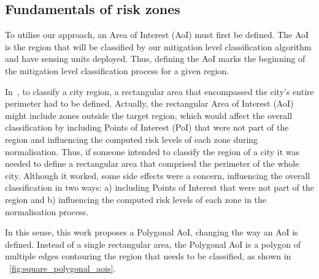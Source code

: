 \begin{refsection}
\section{Fundamentals of risk zones}\label{sec:proposed_approach}


To utilise our approach, an Area of Interest (AoI) must first be defined. The AoI is the region that will be classified by our mitigation level classification algorithm and have sensing units deployed. Thus, defining the AoI marks the beginning of the mitigation level classification process for a given region.

In~\cite{riskzones}, to classify a city region, a rectangular area that encompassed the city's entire perimeter had to be defined. Actually, the rectangular Area of Interest (AoI) might include zones outside the target region, which would affect the overall classification by including Points of Interest (PoI) that were not part of the region and influencing the computed risk levels of each zone during normalisation. Thus, if someone intended to classify the region of a city it was needed to define a rectangular area that comprised the perimeter of the whole city. Although it worked, some side effects were a concern, influencing the overall classification in two ways: a) including Points of Interest that were not part of the region and b) influencing the computed risk levels of each zone in the normalisation process.

In this sense, this work proposes a Polygonal AoI, changing the way an AoI is defined. Instead of a single rectangular area, the Polygonal AoI is a polygon of multiple edges contouring the region that needs to be classified, as shown in \figurename~\ref{fig:square_polygonal_aois}.


\end{refsection}
